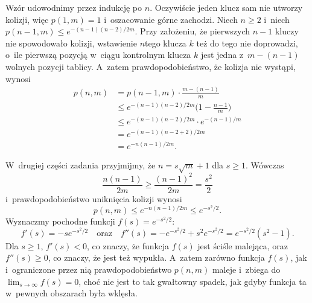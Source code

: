 
\exercise %

\noindent Wzór udowodnimy przez indukcję po $n$.
Oczywiście jeden klucz sam nie utworzy kolizji, więc $p(1,m)=1$ i~oszacowanie górne zachodzi.
Niech $n\ge2$ i~niech $p(n-1,m)\le e^{-(n-1)(n-2)/2m}$.
Przy założeniu, że pierwszych $n-1$ kluczy nie spowodowało kolizji, wstawienie $n$\nbhyphen tego klucza $k$ też do tego nie doprowadzi, o~ile pierwszą pozycją w~ciągu kontrolnym klucza $k$ jest jedna z~$m-(n-1)$ wolnych pozycji tablicy.
A~zatem prawdopodobieństwo, że kolizja nie wystąpi, wynosi
\begin{align*}
	p(n,m) &= p(n-1,m)\cdot\frac{m-(n-1)}{m} \\[1mm]
	&\le e^{-(n-1)(n-2)/2m}\biggl(1-\frac{n-1}{m}\biggr) \\[1mm]
	&\le e^{-(n-1)(n-2)/2m}\cdot e^{-(n-1)/m} \tag{ze wzoru (3.11)} \\
	&= e^{-(n-1)(n-2+2)/2m} \\
	&= e^{-n(n-1)/2m}.
\end{align*}

W~drugiej części zadania przyjmijmy, że $n=s\sqrt{m}+1$ dla $s\ge1$.
Wówczas
\[
	\frac{n(n-1)}{2m} \ge \frac{(n-1)^2}{2m} = \frac{s^2}{2}
\]
i~prawdopodobieństwo uniknięcia kolizji wynosi
\[
	p(n,m) \le e^{-n(n-1)/2m} \le e^{-s^2\!/2}.
\]
Wyznaczmy pochodne funkcji $f(s)=e^{-s^2\!/2}$:
\[
	f'(s) = -se^{-s^2\!/2} \quad\text{oraz}\quad f''(s) = -e^{-s^2\!/2}+s^2e^{-s^2\!/2} = e^{-s^2\!/2}(s^2-1).
\]
Dla $s\ge1$, $f'(s)<0$, co znaczy, że funkcja $f(s)$ jest ściśle malejąca, oraz $f''(s)\ge0$, co znaczy, że jest też wypukła.
A~zatem zarówno funkcja $f(s)$, jak i~ograniczone przez nią prawdopodobieństwo $p(n,m)$ maleje i~zbiega do $\lim_{s\to\infty}f(s)=0$, choć nie jest to tak gwałtowny spadek, jak gdyby funkcja ta w~pewnych obszarach była wklęsła.
